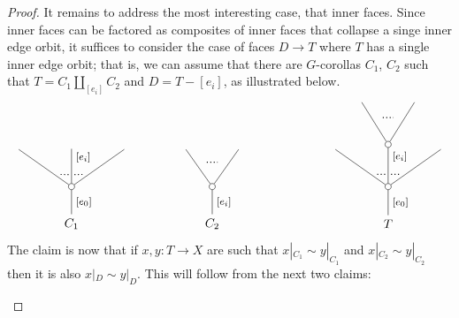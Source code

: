 \documentclass[a4paper,10pt
,draft
]{article}%
\numberwithin{equation}{section}
\numberwithin{figure}{section}
\theoremstyle{definition} %
\newcommand{\1}{\ensuremath{\mathbbm 1}}%
\begin{document}
\begin{proof}
It remains to address the most interesting case,
that inner faces. Since inner faces can be factored as composites of inner faces that collapse a singe inner edge orbit,
it suffices to consider the case of faces
$D \to T$ where $T$ has a single inner edge orbit; that is,
we can assume that there are $G$-corollas
$C_1$, $C_2$ such that 
$T = C_1 \amalg_{[e_i]} C_2$ and
$D = T - [e_i]$, as illustrated below.
\[
\begin{tikzpicture}
[grow=up,auto,level distance=3em,
every node/.style = {font=\footnotesize},
dummy/.style={circle,draw,inner sep=0pt,minimum size=1.75mm}]
	\node at (0,0) [font=\normalsize]{$C_1$}
		child{node [dummy] {}
			child{
			edge from parent node [swap,near end] {} node [near start,inner sep=1pt,name=Kn] {}}
			child[level distance=3.4em]{node {}
			edge from parent node [near end,swap] {$[e_i]$}
node [near start,inner sep=1pt,name=Kone,swap] {}
node [near start,inner sep=1pt,name=Kone1] {}}
			child{
			edge from parent node [near end] {}
node [swap] {}
node [near start,inner sep=1pt,name=Kn1,swap]{}}
		edge from parent node [swap] {$[e_0]$}
		};
		\draw [dotted,thick] (Kone) -- (Kn) ;
		\draw [dotted,thick] (Kone1) -- (Kn1) ;
	\node at (4,0) [font=\normalsize]{$C_2$}
		child{node [dummy] {}
			child{
			edge from parent node [swap,near end] {} node [name=Kn] {}}
			child{
			edge from parent node [near end] {}
node [name=Kone,swap] {}}
		edge from parent node [swap] {$[e_i]$}
		};
		\draw [dotted,thick] (Kone) -- (Kn) ;
	\node at (9,0) [font=\normalsize]{$T$}
		child{node [dummy] {}
			child{
			edge from parent node [swap,near end] {} node [near start,inner sep=1pt,name=Kn] {}}
			child[level distance=3.4em]{node [dummy] {}
				child{
				edge from parent node [swap,near end] {} node [name=Kn2] {}}
				child{
				edge from parent node [near end] {}
node [name=Kone2,swap] {}}
			edge from parent node [near end,swap] {$[e_i]$}
node [near start,inner sep=1pt,name=Kone,swap] {}
node [near start,inner sep=1pt,name=Kone1] {}}
			child{
			edge from parent node [near end] {}
node [swap] {}
node [near start,inner sep=1pt,name=Kn1,swap]{}}
		edge from parent node [swap] {$[e_0]$}
		};
		\draw [dotted,thick] (Kone) -- (Kn) ;
		\draw [dotted,thick] (Kone1) -- (Kn1) ;
		\draw [dotted,thick] (Kone2) -- (Kn2) ;
\end{tikzpicture}
\]
The claim is now that if
$x,y \colon T \to X$ are such that
$x|_{C_1} \sim y|_{C_1}$ and
$x|_{C_2} \sim y|_{C_2}$
then it is also 
$x|_{D} \sim y|_{D}$.
This will follow from the next two claims:
\begin{itemize}

\end{itemize}
\end{proof}
\end{document}

